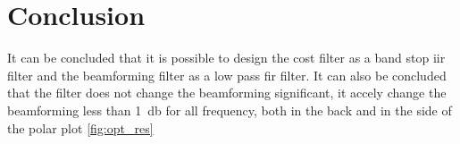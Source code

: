 \section{Conclusion}
It can be concluded that it is possible to design the cost filter as a band stop \gls{iir} filter and the beamforming filter as a low pass \gls{fir} filter. It can also be concluded that the filter does not change the beamforming significant, it accely change the beamforming less than \SI{1}{\decibel} for all frequency, both in the back and in the side of the polar plot \autoref{fig:opt_res}


